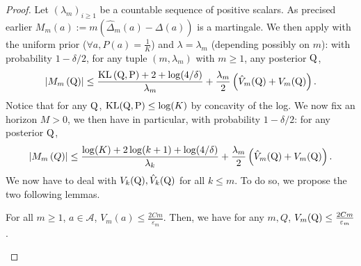 \begin{proof}
Let $(\lambda_m)_{i\geq 1}$ be a countable sequence of positive scalars.
As precised earlier $M_m(a):= m\left(\hat{\Delta}_m(a)-\Delta(a)\right)$ is a martingale.
We then apply  with the uniform prior ($\forall a, P(a)= \frac{1}{K}$) and $\lambda= \lambda_m$  (depending possibly on $m$): with probability $1- \delta/2$, for any tuple $(m,\lambda_m)$ with $m\geq 1$, any posterior $\mathrm{Q}$,
\begin{align*}
\left|M_m\left(\mathrm{Q}\right)\right| \leq \frac{\operatorname{KL}\left(\mathrm{Q}, \mathrm{P}\right)+2 +\log (4/\delta)}{\lambda_m}+ \frac{\lambda_m}{2}\left( \hat{V}_m(\mathrm{Q}) + V_m(\mathrm{Q}) \right).
\end{align*}
Notice that for any $\mathrm{Q}$, $\operatorname{KL}(\mathrm{Q},\mathrm{P})\leq \log(K)$ by concavity of the log.
We now fix an horizon $M>0$, we then have in particular, with probability $1- \delta/2$: for any posterior $\mathrm{Q}$,
\begin{align*}
\left|M_m\left(Q\right)\right| \leq \frac{\log(K)+2 \log (k+1)+\log (4/\delta)}{\lambda_k}+ \frac{\lambda_m}{2}\left( \hat{V}_m(\mathrm{Q}) + V_m(\mathrm{Q}) \right).
\end{align*}
We now have to deal with $V_k(\mathrm{Q}), \hat{V}_k(\mathrm{Q})$ for all $k\leq m$. To do so, we propose the two following lemmas.
\begin{lemma}
\label{l: bandit_lemma_1}
For all $m\geq 1$, $a\in\mathcal{A}$, $V_m(a)\leq \frac{2Cm}{\varepsilon_m}$.
Then, we have for any $m,Q$, $V_m(\mathrm{Q})\leq \frac{2Cm}{\varepsilon_m}$.
\end{lemma}


\end{proof}

